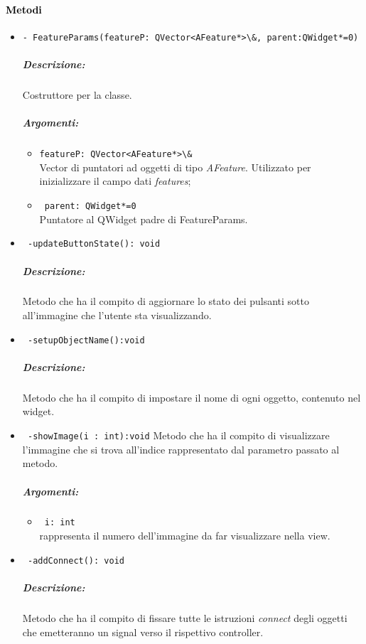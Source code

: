 \paragraph{\textcolor{black}{Metodi\\}}
\begin{itemize}
\item \color{blue}\verb!- FeatureParams(featureP: QVector<AFeature*>\&, parent:QWidget*=0)!
\color{black}
\subparagraph{Descrizione:}
Costruttore per la classe. \\
\subparagraph{Argomenti:}
\begin{itemize}
\item \color{RoyalPurple} \verb!featureP: QVector<AFeature*>\& !\\ Vector di puntatori ad oggetti di tipo \emph{AFeature}. Utilizzato per inizializzare il campo dati \emph{features};
\item \color{RoyalPurple} \verb! parent: QWidget*=0  ! \\ Puntatore al QWidget padre di FeatureParams.
\end{itemize}

\item \color{blue}\verb! -updateButtonState(): void !
\color{black}
\subparagraph{Descrizione:} Metodo che ha il compito di aggiornare lo stato dei pulsanti sotto all'immagine che l'utente sta visualizzando.

\item \color{blue}\verb! -setupObjectName():void!
\color{black}
\subparagraph{Descrizione:} Metodo che ha il compito di impostare il nome di ogni oggetto, contenuto nel widget.
\item \color{blue}\verb! -showImage(i : int):void!
\color{black} Metodo che ha il compito di visualizzare l'immagine che si trova all'indice rappresentato dal parametro passato al metodo.
\subparagraph{Argomenti:}
\begin{itemize}
\item \color{RoyalPurple} \verb! i: int! \\rappresenta il numero dell'immagine da far visualizzare nella view.
\end{itemize}

\item \color{blue}\verb! -addConnect(): void!
\color{black} 
\subparagraph{Descrizione:}
Metodo che ha il compito di fissare tutte le istruzioni \emph{connect} degli oggetti che emetteranno un signal\g{} verso il rispettivo controller.


\end{itemize}
